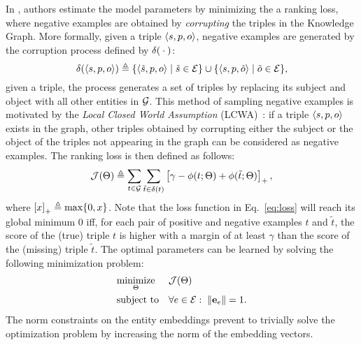 %
In \cite{DBLP:conf/nips/BordesUGWY13,yang15:embedding,DBLP:journals/pieee/Nickel0TG16}, authors estimate the model parameters by minimizing the a ranking loss, where negative examples are obtained by \emph{corrupting} the triples in the Knowledge Graph.
%
More formally, given a triple $\langle s, p, o \rangle$, negative examples are generated by the corruption process defined by $\delta({}\cdot{})$:
%
\begin{equation} \label{eq:corruption}
%
 \corr{\spo} \triangleq \{ \langle \tilde{\rs}, \rp, \ro \rangle \mid \tilde{\rs} \in \ents \} \cup \{ \langle \rs, \rp, \tilde{\ro} \rangle \mid \tilde{\ro} \in \ents \},
%
\end{equation}
%
\noindent \ie given a triple, the process generates a set of triples by replacing its subject and object with all other entities in $\mathcal{G}$.
%
This method of sampling negative examples is motivated by the \emph{Local Closed World Assumption} (LCWA)~\cite{DBLP:conf/kdd/0001GHHLMSSZ14}: if a triple $\langle s, p, o \rangle$ exists in the graph, other triples obtained by corrupting either the subject or the object of the triples not appearing in the graph can be considered as negative examples.
%
%
%
The ranking loss is then defined as follows:
%
\begin{equation} \label{eq:loss}
%
 \loss(\params) \triangleq \sum_{t \in \KG} \sum_{\tilde{t} \in \corr{t}} \hinge{\gamma - \fscore(t ; \params) + \fscore(\tilde{t} ; \params)},
%
\end{equation}
%
\noindent where $\left[ x \right]_{+} \triangleq \max \{ 0, x \}$.
%
Note that the loss function in Eq.~\ref{eq:loss} will reach its global minimum $0$ iff, for each pair of positive and negative examples $t$ and $\tilde{t}$, the score of the (true) triple $t$ is higher with a margin of at least $\gamma$ than the score of the (missing) triple $\tilde{t}$.
%
The optimal parameters can be learned by solving the following minimization problem:
%
\begin{equation} \label{eq:min}
%
 \begin{aligned}
  & \underset{\params}{\text{minimize}}
  & & \loss(\params) \\
  & \text{subject to}
  & & \displaystyle{\forall e \in \ents: \; \norm{\emb{e}} = 1.}
 \end{aligned}
%
\end{equation}
%
The norm constraints on the entity embeddings prevent to trivially solve the optimization problem by increasing the norm of the embedding vectors.
%